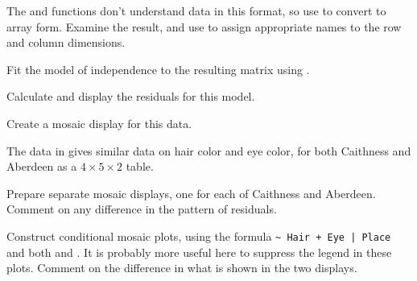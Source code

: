 \documentclass[11pt]{report}\usepackage[]{graphicx}\usepackage[]{color}
\begin{document}
\begin{Exercises}
  \begin{enumerate*}
    \item The  and  functions don't understand data in this format, 
    so use  
    to convert to array form.  Examine the result, and use \newline{} to %
    assign appropriate names to the row and column dimensions.
    \item Fit the model of independence to the resulting matrix using .
    \item Calculate and display the residuals for this model.
    \item Create a mosaic display for this data.
  \end{enumerate*}
  

  \exercise The  data in  gives similar data on hair color and eye color, for both
  Caithness and Aberdeen as a $4 \times 5 \times 2$ table.
  \begin{enumerate*}
    \item Prepare separate mosaic displays, one for each of Caithness and Aberdeen.  Comment on any difference in
    the pattern of residuals.
    \item Construct conditional mosaic plots, using the formula
      \verb/~ Hair + Eye | Place/ and both  and
    . It is probably more useful here to suppress the legend in these plots.  Comment on the
    difference in what is shown in the two displays.
  \end{enumerate*}
  


\end{Exercises}
\end{document}
